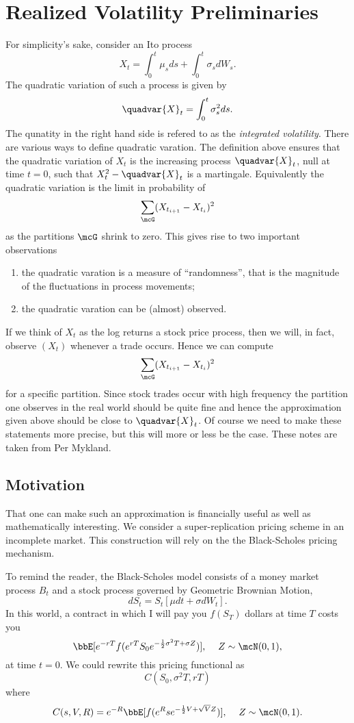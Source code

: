 \documentclass{report}
\begin{document}
\section{Realized Volatility Preliminaries}

For simplicity's sake, consider an Ito process
\[
X_t = \int_0^t \mu_s ds + \int_0^t \sigma_s dW_s.
\]
The quadratic variation of such a process is given by
\[
\quadvar{X}_t = \int_0^t \sigma_s^2 ds.
\]
The qunatity in the right hand side is refered to as the
\emph{integrated volatility}.  There are various ways to define
quadratic varation.  The definition above ensures that the quadratic
variation of $X_t$ is the increasing process $\quadvar{X}_t$, null at
time $t=0$, such that $X_t^2 - \quadvar{X}_t$ is a martingale. 
Equivalently the quadratic variation is the limit in probability of
\[
\sum_{\mcG} (X_{t_{i+1}} - X_{t_i})^2
\]
as the partitions $\mcG$ shrink to zero.  This gives rise to two
important observations
\begin{enumerate}
\item the quadratic varation is a measure of ``randomness'', that is
the magnitude of the fluctuations in process movements;
\item the quadratic varation can be (almost) observed.
\end{enumerate}
If we think of $X_t$ as the log returns a stock price process, then we
will, in fact, observe $(X_t)$ whenever a trade occurs.  Hence we can
compute
\[
\sum_{\mcG} (X_{t_{i+1}} - X_{t_i})^2
\]
for a specific partition.  Since stock trades occur with high
frequency the partition one observes in the real world should be quite
fine and hence the approximation given above should be close to
$\quadvar{X}_t$.  Of course we need to make these statements more
precise, but this will more or less be the case.  These notes are
taken from Per Mykland.

\subsection{Motivation}

That one can make such an approximation is financially useful as well as
mathematically interesting.  We consider a super-replication pricing
scheme in an incomplete market.  This construction will rely on the
the Black-Scholes pricing mechanism.  

To remind the reader, the Black-Scholes model consists of a money market
process $B_t$ and a stock process governed by Geometric Brownian
Motion,
\[
dS_t = S_t [ \mu dt + \sigma dW_t ].
\]
In this world, a contract in which I will pay you $f(S_T)$ dollars at
time $T$ costs you
\[
\bbE[ e^{-rT} f(e^{r T} S_0 e^{-\frac{1}{2} \sigma^2 T + \sigma Z}) ],
\hspace{12pt} Z \sim \mcN(0,1),
\]
at time $t = 0$.  We could rewrite this pricing functional as
\[
C(S_0, \sigma^2 T, r T)
\]
where
\[
C(s,V,R) = e^{-R} \bbE[ f(e^R s e^{-\frac{1}{2} V + \sqrt{V} Z}) ],
\hspace{12pt} Z \sim \mcN(0,1).
\]
\end{document}
